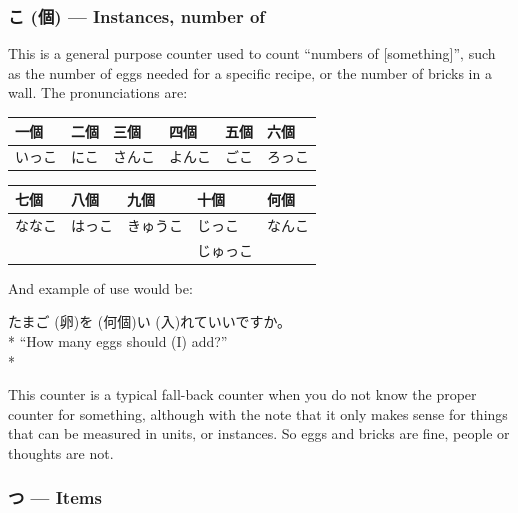 \documentclass[11pt, b5paper, twoside, openright, onecolumn]{book}
\makeatletter
\newcommand*{\rubystack}[2]{{\relscale{0.5}%
  \begin{tabular}[b]{@{}c@{}}%
    {#1}\\%
   {\textscale{2}{#2}}%
  \end{tabular}}%
}
\DeclareRobustCommand*{\ruby}[2]{%
  \mbox{%
    \setlength{\parskip}{0ex}%
    \BeginAccSupp{method=pdfstringdef,ActualText={#1}}%
      \rubystack{\phantom{#2}}{#1}%
      \llap{%
        \rubystack{#2}{\phantom{#1}}%
      }%
    \EndAccSupp{}%
  }%
}
\renewcommand*{\ruby}[2]{#2 (#1)}%
\newenvironment{exampleblock}{
\setlength{\parindent}{0.6in}
\begin{minipage}[t]{\dimexpr\textwidth-\parindent}}
{\end{minipage}}
\newenvironment{mytabular}[1]{\noindent\hspace{0.4in}
\begin{tabular}[h]{#1}}{\end{tabular}}
\makeatother
\begin{document}
\subsubsection{\ruby{個}{こ} — Instances‚ number of}

This is a general purpose counter used to count “numbers of [something]”‚ such as the number of eggs needed for a specific recipe‚ or the number of bricks in a wall. The pronunciations are:

\vspace{0.5cm}
\smaller
\begin{mytabular}{| l  l  l  l  l  l |}\hline 
\rule{0pt}{2.4ex}一個 & 二個 & 三個 & 四個 & 五個 & 六個\\ 
\hline
\rule{0pt}{2.4ex}いっこ & にこ & さんこ & よんこ & ごこ & ろっこ\\ 
\hline 
\end{mytabular}
\larger
\vspace{0.5cm}

\smaller
\begin{mytabular}{| l  l  l  l  l |}\hline 
\rule{0pt}{2.4ex}七個 & 八個 & 九個 & 十個 & 何個\\ 
\hline
\rule{0pt}{2.4ex}ななこ & はっこ & きゅうこ & じっこ & なんこ\\ 
\rule{0pt}{2.4ex} &  &  & じゅっこ & \\ 
\hline 
\end{mytabular}
\larger
\vspace{0.5cm}


And example of use would be:

\vspace{0.4cm}
\begin{exampleblock}
\ruby{卵}{たまご}を\ruby{何個}{}\ruby{入}{い}れていいですか。 \\* 
“How many eggs should (I) add?” \\* 
\end{exampleblock}
\vspace{0.2cm}

This counter is a typical fall-back counter when you do not know the proper counter for something‚ although with the note that it only makes sense for things that can be measured in units‚ or instances. So eggs and bricks are fine‚ people or thoughts are not.

\subsubsection{つ — Items}
\end{document}
